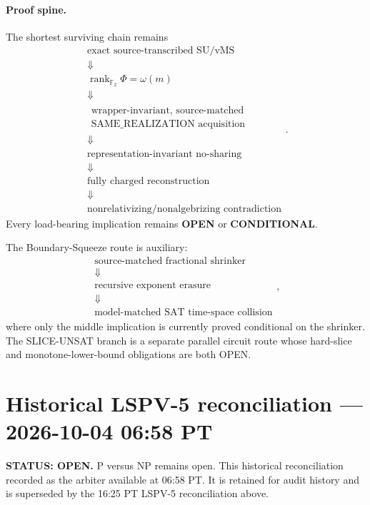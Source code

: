 \documentclass[11pt]{article}
\begin{document}
\paragraph{Proof spine.}
The shortest surviving chain remains
\[
\begin{gathered}
\text{exact source-transcribed SU/vMS}
\\[-1mm]\Downarrow\\[-1mm]
\operatorname{rank}_{\mathbb F_2}\Phi=\omega(m)
\\[-1mm]\Downarrow\\[-1mm]
\substack{\text{wrapper-invariant, source-matched}\\
\text{SAME\_REALIZATION acquisition}}
\\[-1mm]\Downarrow\\[-1mm]
\text{representation-invariant no-sharing}
\\[-1mm]\Downarrow\\[-1mm]
\text{fully charged reconstruction}
\\[-1mm]\Downarrow\\[-1mm]
\text{nonrelativizing/nonalgebrizing contradiction}
\end{gathered}.
\]
Every load-bearing implication remains \textbf{OPEN} or \textbf{CONDITIONAL}.

The Boundary-Squeeze route is auxiliary:
\[
\begin{gathered}
\text{source-matched fractional shrinker}
\\[-1mm]\Downarrow\\[-1mm]
\text{recursive exponent erasure}
\\[-1mm]\Downarrow\\[-1mm]
\text{model-matched SAT time-space collision}
\end{gathered},
\]
where only the middle implication is currently proved conditional on the shrinker. The
SLICE-UNSAT branch is a separate parallel circuit route whose hard-slice and monotone-lower-bound
obligations are both OPEN.


\section{Historical LSPV-5 reconciliation --- 2026-10-04 06:58 PT}
\textbf{STATUS: OPEN.} P versus NP remains open. This historical reconciliation recorded
 as the arbiter available at 06:58 PT.
It is retained for audit history and is superseded by the 16:25 PT LSPV-5 reconciliation above.
\end{document}
